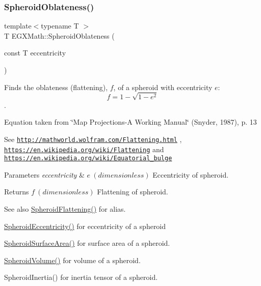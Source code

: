 \subsubsection{\texorpdfstring{Spheroid\+Oblateness()}{SpheroidOblateness()}\hspace{0.1cm}{\footnotesize\ttfamily [2/2]}}
{\footnotesize\ttfamily template$<$typename T $>$ \\
T E\+G\+X\+Math\+::\+Spheroid\+Oblateness (\begin{DoxyParamCaption}\item[{const T}]{eccentricity }\end{DoxyParamCaption})}



Finds the oblateness (flattening), $f$, of a spheroid with eccentricity $e$\+: \[ f = 1 - \sqrt{1-e^2} \]. 

Equation taken from \char`\"{}\+Map Projections-\/\+A Working Manual\char`\"{} (Snyder, 1987), p. 13

See \href{http://mathworld.wolfram.com/Flattening.html}{\tt http\+://mathworld.\+wolfram.\+com/\+Flattening.\+html} , \href{https://en.wikipedia.org/wiki/Flattening}{\tt https\+://en.\+wikipedia.\+org/wiki/\+Flattening} and \href{https://en.wikipedia.org/wiki/Equatorial_bulge}{\tt https\+://en.\+wikipedia.\+org/wiki/\+Equatorial\+\_\+bulge} 
\begin{DoxyParams}{Parameters}
{\em eccentricity} & $ e\ (dimensionless)$ Eccentricity of spheroid. \\
\hline
\end{DoxyParams}
\begin{DoxyReturn}{Returns}
$ f\ (dimensionless)$ Flattening of spheroid. 
\end{DoxyReturn}
\begin{DoxySeeAlso}{See also}
\mbox{\hyperlink{group___e_g_x_math-_geometry-3_d-_spheroid-_flattening_ga9822b6e1025edbf7d272949547c53511}{Spheroid\+Flattening()}} for alias. 

\mbox{\hyperlink{group___e_g_x_math-_geometry-3_d-_spheroid-_eccentricity_gab45680528a41bb7a5e15ddc0059156dd}{Spheroid\+Eccentricity()}} for eccentricity of a spheroid 

\mbox{\hyperlink{group___e_g_x_math-_geometry-3_d-_spheroid-_surface_area_ga32a21d075102ea9a235a43165675627e}{Spheroid\+Surface\+Area()}} for surface area of a spheroid. 

\mbox{\hyperlink{group___e_g_x_math-_geometry-3_d-_spheroid-_volume_gac89ed1e10e56c724b341591ecc5605dc}{Spheroid\+Volume()}} for volume of a spheroid. 

Spheroid\+Inertia() for inertia tensor of a spheroid. 
\end{DoxySeeAlso}
